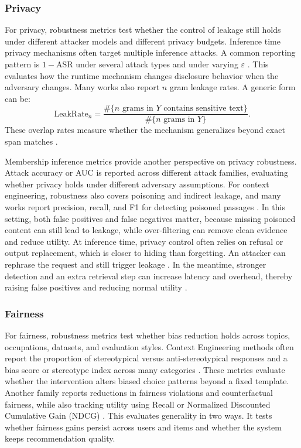 \subsubsection{Privacy}
For privacy, robustness metrics test whether the control of leakage still holds under different attacker models and different privacy budgets.
Inference time privacy mechanisms often target multiple inference attacks.
A common reporting pattern is $1-\mathrm{ASR}$ under several attack types and under varying $\varepsilon$ \citep{tong2025inferdpt, chaudhari2024phantom, DBLP:conf/kdd/Zhang0ZZ025}.
This evaluates how the runtime mechanism changes disclosure behavior when the adversary changes.
Many works also report $n$ gram leakage rates. A generic form can be:
\[
\mathrm{LeakRate}_n
=
\frac{\#\{\text{$n$ grams in }Y \text{ contains sensitive text}\}}
{\#\{\text{$n$ grams in }Y\}}.
\]
These overlap rates measure whether the mechanism generalizes beyond exact span matches \citep{tong2025inferdpt}.

Membership inference metrics provide another perspective on privacy robustness. Attack accuracy or AUC is reported across different attack families, evaluating whether privacy holds under different adversary assumptions. For context engineering, robustness also covers poisoning and indirect leakage, and many works report precision, recall, and F1 for detecting poisoned passages \citep{zou2025poisonedrag, wei2025speculationspillssecretschannels, zhong2023poisoning}. In this setting, both false positives and false negatives matter, because missing poisoned content can still lead to leakage, while over-filtering can remove clean evidence and reduce utility. At inference time, privacy control often relies on refusal or output replacement, which is closer to hiding than forgetting.
An attacker can rephrase the request and still trigger leakage \citep{tong2025inferdpt, chaudhari2024phantom}. In the meantime, stronger detection and an extra retrieval step can increase latency and overhead, thereby raising false positives and reducing normal utility \citep{grimes2024concept, zou2025poisonedrag}.

\subsubsection{Fairness}
For fairness, robustness metrics test whether bias reduction holds across topics, occupations, datasets, and evaluation styles.
Context Engineering methods often report the proportion of stereotypical versus anti-stereotypical responses and a bias score or stereotype index across many categories \citep{kamruzzaman2024prompting, dwivedi2023breaking, dhingra2023queer}.
These metrics evaluate whether the intervention alters biased choice patterns beyond a fixed template. Another family reports reductions in fairness violations and counterfactual fairness, while also tracking utility using Recall or Normalized Discounted Cumulative Gain (NDCG) \citep{huang2024bias, DBLP:conf/icml/FayyaziKP25}. This evaluates generality in two ways. It tests whether fairness gains persist across users and items and whether the system keeps recommendation quality.

